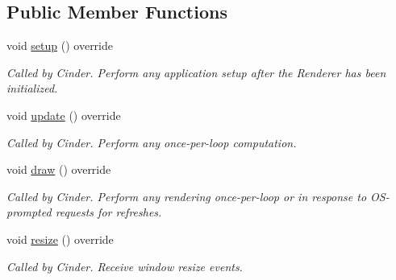 \subsection*{Public Member Functions}
\begin{DoxyCompactItemize}
\item 
\mbox{\label{classpepr3d_1_1_main_application_a5b6116d8f876a0ffe82ac50a79699a80}} 
void \mbox{\hyperlink{classpepr3d_1_1_main_application_a5b6116d8f876a0ffe82ac50a79699a80}{setup}} () override
\begin{DoxyCompactList}\small\item\em Called by Cinder. Perform any application setup after the Renderer has been initialized. \end{DoxyCompactList}\item 
\mbox{\label{classpepr3d_1_1_main_application_aaeaff9b43639879dc3f318c97ae28a78}} 
void \mbox{\hyperlink{classpepr3d_1_1_main_application_aaeaff9b43639879dc3f318c97ae28a78}{update}} () override
\begin{DoxyCompactList}\small\item\em Called by Cinder. Perform any once-\/per-\/loop computation. \end{DoxyCompactList}\item 
\mbox{\label{classpepr3d_1_1_main_application_abc78d4bf492874de9bfd6f38fdc0a9d1}} 
void \mbox{\hyperlink{classpepr3d_1_1_main_application_abc78d4bf492874de9bfd6f38fdc0a9d1}{draw}} () override
\begin{DoxyCompactList}\small\item\em Called by Cinder. Perform any rendering once-\/per-\/loop or in response to O\+S-\/prompted requests for refreshes. \end{DoxyCompactList}\item 
\mbox{\label{classpepr3d_1_1_main_application_aa65c16b49a329894f4c11e8ec170ff77}} 
void \mbox{\hyperlink{classpepr3d_1_1_main_application_aa65c16b49a329894f4c11e8ec170ff77}{resize}} () override
\begin{DoxyCompactList}\small\item\em Called by Cinder. Receive window resize events. \end{DoxyCompactList}\item 

\end{DoxyCompactItemize}
